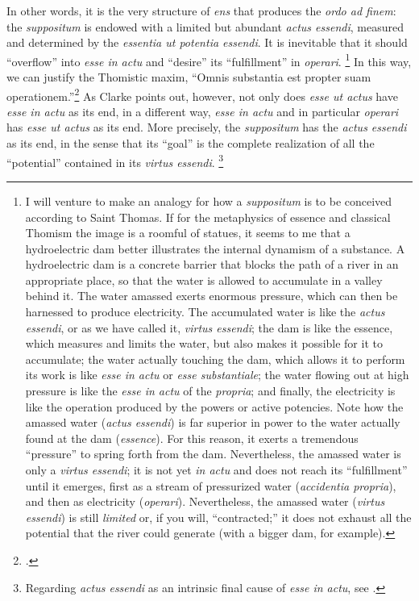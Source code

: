 %
In other words, it is the very structure of \emph{ens} that produces the \emph{ordo ad finem}: the \emph{suppositum} is endowed with a limited but abundant \emph{actus essendi}, measured and determined by the \emph{essentia ut potentia essendi}. It is inevitable that it should “overflow” into \emph{esse in actu} and “desire” its “fulfillment” in \emph{operari}.%
%
\footnote{I will venture to make an analogy for how a \emph{suppositum} is to be conceived according to Saint Thomas. If for the metaphysics of essence and classical Thomism the image is a roomful of statues, it seems to me that a hydroelectric dam better illustrates the internal dynamism of a substance. A hydroelectric dam is a concrete barrier that blocks the path of a river in an appropriate place, so that the water is allowed to accumulate in a valley behind it. The water amassed exerts enormous pressure, which can then be harnessed to produce electricity. The accumulated water is like the \emph{actus essendi}, or as we have called it, \emph{virtus essendi}; the dam is like the essence, which measures and limits the water, but also makes it possible for it to accumulate; the water actually touching the dam, which allows it to perform its work is like \emph{esse in actu} or \emph{esse substantiale}; the water flowing out at high pressure is like the \emph{esse in actu} of the \emph{propria}; and finally, the electricity is like the operation produced by the powers or active potencies. Note how the amassed water (\emph{actus essendi}) is far superior in power to the water actually found at the dam (\emph{essence}). For this reason, it exerts a tremendous “pressure” to spring forth from the dam. Nevertheless, the amassed water is only a \emph{virtus essendi}; it is not yet \emph{in actu} and does not reach its “fulfillment” until it emerges, first as a stream of pressurized water (\emph{accidentia propria}), and then as electricity (\emph{operari}). Nevertheless, the amassed water (\emph{virtus essendi}) is still \emph{limited} or, if you will, “contracted;” it does not exhaust all the potential that the river could generate (with a bigger dam, for example).}
%
In this way, we can justify the Thomistic maxim, “Omnis substantia est propter suam operationem.”\footcite[I, cap.~45, n.~6 (Marietti n.~387)]{st:contragent} As Clarke points out, however, not only does \emph{esse ut actus} have \emph{esse in actu} as its end, in a different way, \emph{esse in actu} and in particular \emph{operari} has \emph{esse ut actus} as its end. More precisely, the \emph{suppositum} has the \emph{actus essendi} as its end, in the sense that its “goal” is the complete realization of all the “potential” contained in its \emph{virtus essendi}.%
%
\footnote{Regarding \emph{actus essendi} as an intrinsic final cause of \emph{esse in actu}, see \cite[61–62]{contat:esse-essentia-ordo}.}
%

\begin{DONE}
\end{DONE}